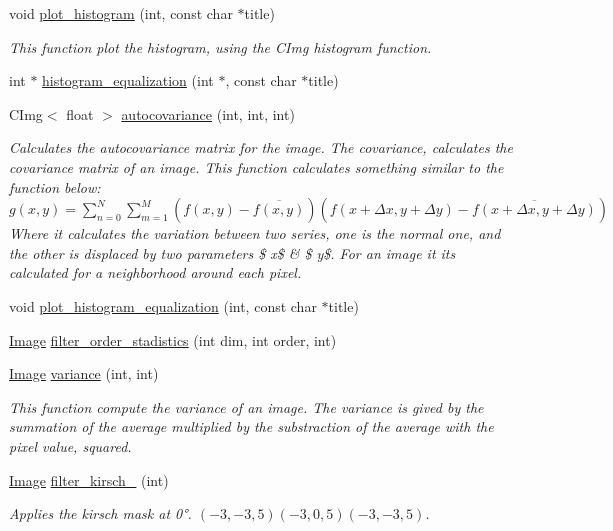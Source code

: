 \begin{DoxyCompactItemize}
\item 
void \hyperlink{class_image_a7ecc9bcad8ac9f0fe4fc42a1810f2b35}{plot\-\_\-histogram} (int, const char $\ast$title)
\begin{DoxyCompactList}\small\item\em This function plot the histogram, using the C\-Img histogram function. \end{DoxyCompactList}\item 
int $\ast$ \hyperlink{class_image_a10fff70095a24a0a10376ffa740a3262}{histogram\-\_\-equalization} (int $\ast$, const char $\ast$title)
\item 
C\-Img$<$ float $>$ \hyperlink{class_image_a42c17e010d45f8ec72dc89d7cdd76249}{autocovariance} (int, int, int)
\begin{DoxyCompactList}\small\item\em Calculates the autocovariance matrix for the image. The covariance, calculates the covariance matrix of an image. This function calculates something similar to the function below\-: $ g(x,y) = \sum \limits_{n=0}^{N} \sum \limits_{m=1}^M \left( f(x,y) - \overline{f(x,y)}\right)\left(f(x + \Delta x, y + \Delta y) - \overline{f(x + \Delta x, y + \Delta y)} \right) $ Where it calculates the variation between two series, one is the normal one, and the other is displaced by two parameters \$ x\$ \& \$ y\$. For an image it its calculated for a neighborhood around each pixel. \end{DoxyCompactList}\item 
void \hyperlink{class_image_ac792db3b148a2b42e4ce1ee2ba7ac757}{plot\-\_\-histogram\-\_\-equalization} (int, const char $\ast$title)
\item 
\hyperlink{class_image}{Image} \hyperlink{class_image_a44679d228a0d6864fb1cfe4fb2dc83af}{filter\-\_\-order\-\_\-stadistics} (int dim, int order, int)
\item 
\hyperlink{class_image}{Image} \hyperlink{class_image_aad9aac9600334fb18ae54e4807a12dc5}{variance} (int, int)
\begin{DoxyCompactList}\small\item\em This function compute the variance of an image. The variance is gived by the summation of the average multiplied by the substraction of the average with the pixel value, squared. \end{DoxyCompactList}\item 
\hyperlink{class_image}{Image} \hyperlink{class_image_a9551b317e71d65ca1573a9518644154d}{filter\-\_\-kirsch\-\_} (int)
\begin{DoxyCompactList}\small\item\em Applies the kirsch mask at 0°. $(-3,-3,5)(-3,0,5)(-3,-3,5)$. \end{DoxyCompactList}\item 

\end{DoxyCompactItemize}
